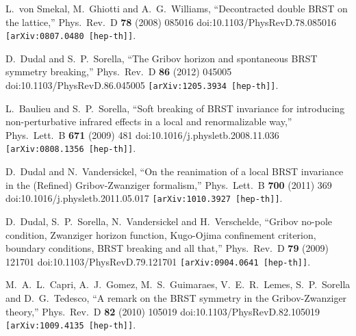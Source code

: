 \documentclass[a4paper,11pt,british,twosides]{book}%
\numberwithin{equation}{section}
\begin{document}
\begin{thebibliography}{9}
  L.~von Smekal, M.~Ghiotti and A.~G.~Williams,
  ``Decontracted double BRST on the lattice,''
  Phys.\ Rev.\ D {\bf 78} (2008) 085016
  doi:10.1103/PhysRevD.78.085016
  {\tt [arXiv:0807.0480 [hep-th]]}.

  D.~Dudal and S.~P.~Sorella,
  ``The Gribov horizon and spontaneous BRST symmetry breaking,''
  Phys.\ Rev.\ D {\bf 86} (2012) 045005
  doi:10.1103/PhysRevD.86.045005
  {\tt [arXiv:1205.3934 [hep-th]]}.

  L.~Baulieu and S.~P.~Sorella,
  ``Soft breaking of BRST invariance for introducing non-perturbative infrared effects in a
  local and renormalizable way,''
  Phys.\ Lett.\ B {\bf 671} (2009) 481
  doi:10.1016/j.physletb.2008.11.036
  {\tt [arXiv:0808.1356 [hep-th]]}.

  D.~Dudal and N.~Vandersickel,
  ``On the reanimation of a local BRST invariance in the (Refined) Gribov-Zwanziger
  formalism,''
  Phys.\ Lett.\ B {\bf 700} (2011) 369
  doi:10.1016/j.physletb.2011.05.017
  {\tt [arXiv:1010.3927 [hep-th]]}.
  
  D.~Dudal, S.~P.~Sorella, N.~Vandersickel and H.~Verschelde,
  ``Gribov no-pole condition, Zwanziger horizon function, Kugo-Ojima confinement criterion,
  boundary conditions, BRST breaking and all that,''
  Phys.\ Rev.\ D {\bf 79} (2009) 121701
  doi:10.1103/PhysRevD.79.121701
  {\tt [arXiv:0904.0641 [hep-th]]}.
    
  M.~A.~L.~Capri, A.~J.~Gomez, M.~S.~Guimaraes, V.~E.~R.~Lemes, S.~P.~Sorella and
  D.~G.~Tedesco,
  ``A remark on the BRST symmetry in the Gribov-Zwanziger theory,''
  Phys.\ Rev.\ D {\bf 82} (2010) 105019
  doi:10.1103/PhysRevD.82.105019
  {\tt [arXiv:1009.4135 [hep-th]]}.


\end{thebibliography}
\end{document}
